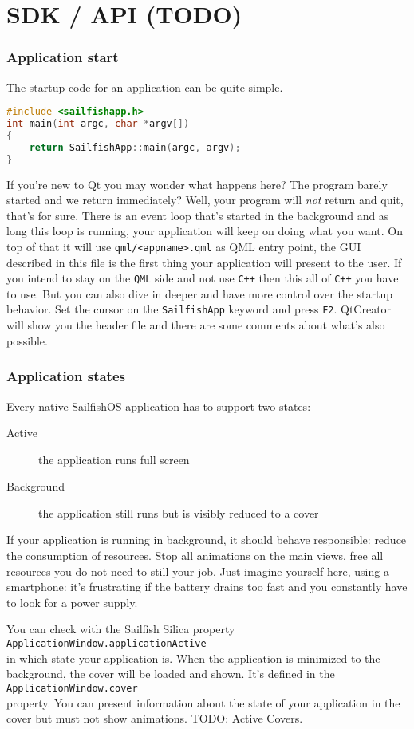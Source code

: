 %
\section{SDK / API (TODO)}\label{sec:sdk:api}
%
%
%
\subsubsection{Application start}
%
The startup code for an application can be quite simple.
%
\begin{lstlisting}[language=c++]
#include <sailfishapp.h>
int main(int argc, char *argv[])
{
    return SailfishApp::main(argc, argv);
}
\end{lstlisting}
%
If you're new to Qt you may wonder what happens here? The program barely started and we return immediately? Well, your program will \emph{not} return and quit, that's for sure. There is an event loop that's started in the background and as long this loop is running, your application will keep on doing what you want. On top of that it will use \verb,qml/<appname>.qml, as QML entry point, the GUI described in this file is the first thing your application will present to the user. If you intend to stay on the \verb,QML, side and not use \verb,C++, then this all of \verb,C++, you have to use. But you can also dive in deeper and have more control over the startup behavior. Set the cursor on the \verb,SailfishApp, keyword and press \verb,F2,. QtCreator will show you the header file and there are some comments about what's also possible.
%
%
\subsubsection{Application states}
%
Every native SailfishOS application has to support two states:
%
\begin{description}
\item [Active] the application runs full screen
\item [Background] the application still runs but is visibly reduced to a cover
\end{description}
%
If your application is running in background, it should behave responsible: reduce the consumption of resources. Stop all animations on the main views, free all resources you do not need to still your job. Just imagine yourself here, using a smartphone: it's frustrating if the battery drains too fast and you constantly have to look for a power supply.

You can check with the Sailfish Silica property \\
\verb,ApplicationWindow.applicationActive, \\
in which state your application is. When the application is minimized to the background, the cover will be loaded and shown. It's defined in the \\
\verb,ApplicationWindow.cover, \\
property. You can present information about the state of your application in the cover but must not show animations.
%
TODO: Active Covers.
%
%
